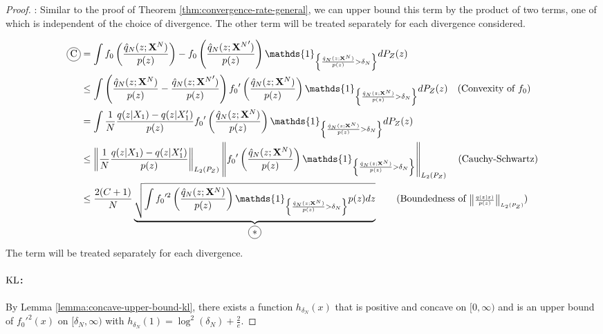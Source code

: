 \begin{proof}
: Similar to the proof of Theorem \ref{thm:convergence-rate-general}, we can upper bound this term by the product of two terms, one of which is independent of the choice of divergence.
The other term will be treated separately for each divergence considered.


\begin{align*}
    \encircle{C} &= \int {f_0}\left( \frac{\hat{q}_N(z;\XN)}{p(z)}\right) - {f_0}\left( \frac{\hat{q}_N(z;{\XN}')}{p(z)} \right) \mathds{1}_{\left\lbrace \frac{\hat{q}_N(z;\XN)}{p(z)} > \delta_N \right\rbrace} dP_Z(z) \\
    &\leq \int \left(\frac{\hat{q}_N(z;\XN)}{p(z)} - \frac{\hat{q}_N(z;{\XN}')}{p(z)}\right) {f_0}'\left(\frac{\hat{q}_N(z;\XN)}{p(z)} \right) \mathds{1}_{\left\lbrace \frac{\hat{q}_N(z;\XN)}{p(z)} > \delta_N \right\rbrace} dP_Z(z) 
    \quad \text{(Convexity of ${f_0}$)}
    \\
    &= \int \frac{1}{N}\frac{q(z|X_1) - q(z|X'_1)}{p(z)}  {f_0}'\left(\frac{\hat{q}_N(z;\XN)}{p(z)} \right) \mathds{1}_{\left\lbrace \frac{\hat{q}_N(z;\XN)}{p(z)} > \delta_N \right\rbrace} dP_Z(z) \\
    &\leq \left\| \frac{1}{N}\frac{q(z|X_1) - q(z|X'_1)}{p(z)}\right\|_{L_2(P_Z)}
    \left\| {f_0}'\left(\frac{\hat{q}_N(z;\XN)}{p(z)} \right) \mathds{1}_{\left\lbrace \frac{\hat{q}_N(z;\XN)}{p(z)} > \delta_N \right\rbrace} \right\|_{L_2(P_Z)} 
    \quad \text{(Cauchy-Schwartz)}
    \\
    &\leq \frac{2(C+1)}{N} \underbrace{\sqrt{\int {f_0}'^2\left(\frac{\hat{q}_N(z;\XN)}{p(z)} \right) \mathds{1}_{\left\lbrace \frac{\hat{q}_N(z;\XN)}{p(z)} > \delta_N \right\rbrace} p(z) dz }}_{\encircle{$*$}}
    \qquad \text{(Boundedness of ${\scriptscriptstyle\left\| \frac{q(z|x)}{p(z)}\right\|_{L_2(P_Z)}}$)}
    \\
\end{align*}
The term \encircle{$*$} will be treated separately for each divergence.

\paragraph{$\mathrm{KL}$:}

By Lemma \ref{lemma:concave-upper-bound-kl}, there exists a function $h_{\delta_N}(x)$ that is positive and concave on $[0, \infty)$ and is an upper bound of $f_0'^2(x)$ on $[\delta_N, \infty)$ with $h_{\delta_N}(1) = \log^2(\delta_N) + \frac{2}{e}$.


\end{proof}
